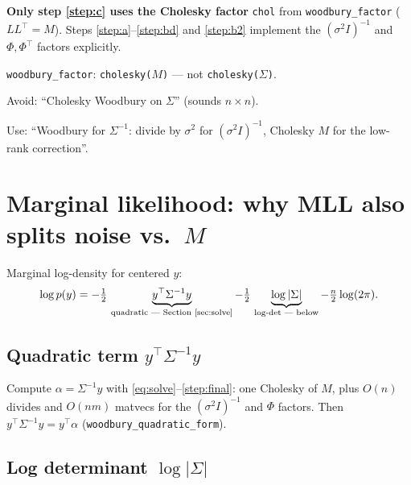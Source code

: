 \documentclass[11pt]{article}
\newcommand{\noise}{\sigma^2}
\newcommand{\Sig}{\Sigma}
\newcommand{\Ph}{\Phi}
\begin{document}
\begin{samebox}
\textbf{Only step \eqref{step:c} uses the Cholesky factor} \texttt{chol} from \texttt{woodbury\_factor}
($LL^{\top}=M$). Steps \eqref{step:a}--\eqref{step:bd} and \eqref{step:b2} implement the
$(\noise I)^{-1}$ and $\Ph,\Ph^{\top}$ factors explicitly.
\end{samebox}

\texttt{woodbury\_factor}: \texttt{cholesky(}$M$\texttt{)} --- not \texttt{cholesky(}$\Sig$\texttt{)}.

\begin{diffbox}
Avoid: ``Cholesky Woodbury on $\Sig$'' (sounds $n\times n$).
\end{diffbox}
\begin{samebox}
Use: ``Woodbury for $\Sig^{-1}$: divide by $\noise$ for $(\noise I)^{-1}$, Cholesky $M$ for the low-rank correction''.
\end{samebox}

\section{Marginal likelihood: why MLL also splits noise vs.\ $M$}
\label{sec:logdet}

Marginal log-density for centered $y$:
\begin{equation}
  \label{eq:mll}
  \log p(y)
  = -\tfrac{1}{2}\,\underbrace{y^{\top}\Sig^{-1}y}_{\text{quadratic --- Section~\ref{sec:solve}}}
  -\tfrac{1}{2}\,\underbrace{\log|\Sig|}_{\text{log-det --- below}}
  -\tfrac{n}{2}\log(2\pi).
\end{equation}

\subsection{Quadratic term $y^{\top}\Sig^{-1}y$}

Compute $\alpha=\Sig^{-1}y$ with \eqref{eq:solve}--\eqref{step:final}: one Cholesky of $M$, plus
$O(n)$ divides and $O(nm)$ matvecs for the $(\noise I)^{-1}$ and $\Ph$ factors.
Then $y^{\top}\Sig^{-1}y = y^{\top}\alpha$ (\texttt{woodbury\_quadratic\_form}).

\subsection{Log determinant $\log|\Sig|$}
\end{document}
